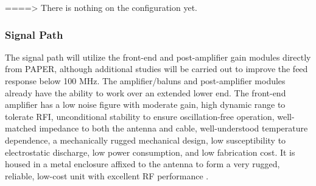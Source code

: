 \documentclass[preprint]{aastex}
\begin{document}
====> There is nothing on the configuration yet.

\vspace{-0.25in}
\subsubsection{Signal Path}
\vspace{-6pt}
The signal path will utilize the front-end and post-amplifier gain modules directly
from PAPER, although additional studies will be carried out to improve the feed
response below 100 MHz. The amplifier/baluns and post-amplifier modules already have
the ability to work over an extended lower end. The front-end amplifier has a low
noise figure with moderate gain, high dynamic range to tolerate RFI, unconditional
stability to ensure oscillation-free operation, well-matched impedance to both the
antenna and cable, well-understood temperature dependence, a mechanically rugged
mechanical design, low susceptibility to electrostatic discharge, low power
consumption, and low fabrication cost. It is housed in a metal enclosure affixed to
the antenna to form a very rugged, reliable, low-cost unit with excellent RF
performance \citep{parsons_et_al2010}.
\end{document}
